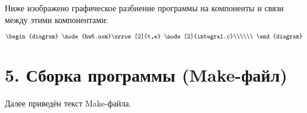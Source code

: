 \documentclass[a4paper,12pt,titlepage,finall]{article}
\begin{document}
\item{Ниже изображено графическое разбиение программы на компоненты и связи между этими компонентами:}


\[ \begin{diagram}
   \node{hw6.asm}\arrow[2]{t,e}
   \node[2]{integral.c}\\\\\\
\end{diagram}\] 


\newpage

\section{5. Сборка программы (Make-файл)}

Далее приведён текст Make-файла.
\newline
\end{document}
